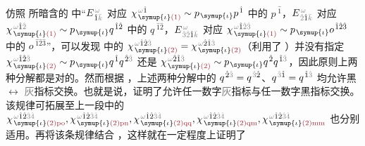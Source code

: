 仿照  所暗含的  中“$E^{\;\!\mathcolor{gray}{\omega}}_{\;\! \hat{1} \mathcolor{gray}{\bar{k}}}$ 对应 $\chi^{\;\! \mathcolor{gray}{\omega} \hat{1}}_{\;\! \symup{\iota} \textcolor{Maroon}{(1)}} \sim p_{\;\! \symup{\iota}} p^{\;\! \hat{1}}$ 中的 $p^{\;\! \hat{1}}$，$E^{\;\!\mathcolor{gray}{\omega}}_{\;\! \mathcolor{gray}{\hat{2}} \hat{1} \mathcolor{gray}{\bar{k}}}$ 对应 $\chi^{\;\! \mathcolor{gray}{\omega} \hat{1} \mathcolor{gray}{\hat{2}}}_{\;\! \symup{\iota} \textcolor{Maroon}{(1)}} \sim p_{\;\! \symup{\iota}} q^{\;\! \hat{1} \hat{2}}$ 中的 $q^{\;\! \hat{1} \hat{2}}$，$E^{\;\!\mathcolor{gray}{\omega}}_{\;\! \mathcolor{gray}{\hat{3} \hat{2}} \hat{1} \mathcolor{gray}{\bar{k}}}$ 对应 $\chi^{\;\! \mathcolor{gray}{\omega} \hat{1} \mathcolor{gray}{\hat{2} \hat{3}}}_{\;\! \symup{\iota} \textcolor{Maroon}{(1)}} \sim p_{\;\! \symup{\iota}} o^{\;\! \hat{1} \hat{2} \hat{3}}$ 中的 $o^{\;\! \hat{1} \hat{2} \hat{3}}$”，可以发现  中的 $\chi^{\;\! \mathcolor{gray}{\omega} \hat{1} \hat{2} \mathcolor{gray}{\hat{3}}}_{\;\! \symup{\iota} \textcolor{Maroon}{(2)}} = \chi^{\;\! \mathcolor{gray}{\omega} \hat{2} \hat{1} \mathcolor{gray}{\hat{3}}}_{\;\! \symup{\iota} \textcolor{Maroon}{(2)}}$（利用了 ）并没有指定 $\chi^{\;\! \mathcolor{gray}{\omega} \hat{1} \hat{2} \mathcolor{gray}{\hat{3}}}_{\;\! \symup{\iota} \textcolor{Maroon}{(2)}} \sim p_{\;\! \symup{\iota}} q^{\;\! \hat{1}} q^{\;\! \hat{2} \mathcolor{gray}{\hat{3}}}$ 还是 $\chi^{\;\! \mathcolor{gray}{\omega} \hat{2} \hat{1} \mathcolor{gray}{\hat{3}}}_{\;\! \symup{\iota} \textcolor{Maroon}{(2)}} \sim p_{\;\! \symup{\iota}} q^{\;\! \hat{2}} q^{\;\! \hat{1} \mathcolor{gray}{\hat{3}}}$，因此原则上两种分解都是对的。然而根据 ，上述两种分解中的 $q^{\;\! \hat{2} \mathcolor{gray}{\hat{3}}} = q^{\;\! \mathcolor{gray}{\hat{3}} \hat{2}}$、$q^{\;\! \mathcolor{gray}{\hat{3}} \hat{1}} = q^{\;\! \hat{1} \mathcolor{gray}{\hat{3}}}$ 均允许黑$\longleftrightarrow$ \textcolor{gray}{灰}指标交换。也就是说，证明了允许任一数字\textcolor{gray}{灰}指标与任一数字黑指标交换。该规律可拓展至上一段中的 $\chi^{\;\! \mathcolor{gray}{\omega} \hat{1} \hat{2} \mathcolor{gray}{\hat{3} \hat{4}}}_{\;\! \symup{\iota} \textcolor{Maroon}{(2)\text{po}}}, \chi^{\;\! \mathcolor{gray}{\omega} \hat{1} \hat{2} \mathcolor{gray}{\hat{3} \hat{4}}}_{\;\! \symup{\iota} \textcolor{Maroon}{(2)\text{pn}}}, \chi^{\;\! \mathcolor{gray}{\omega} \hat{1} \hat{2} \mathcolor{gray}{\hat{3} \hat{4}}}_{\;\! \symup{\iota} \textcolor{Maroon}{(2)\text{qq}}}, \chi^{\;\! \mathcolor{gray}{\omega} \hat{1} \hat{2} \mathcolor{gray}{\hat{3} \hat{4}}}_{\;\! \symup{\iota} \textcolor{Maroon}{(2)\text{qm}}}, \chi^{\;\! \mathcolor{gray}{\omega} \hat{1} \hat{2} \mathcolor{gray}{\hat{3} \hat{4}}}_{\;\! \symup{\iota} \textcolor{Maroon}{(2)\text{mm}}}$ 也分别适用。再将该条规律结合 ，这样就在一定程度上证明了
